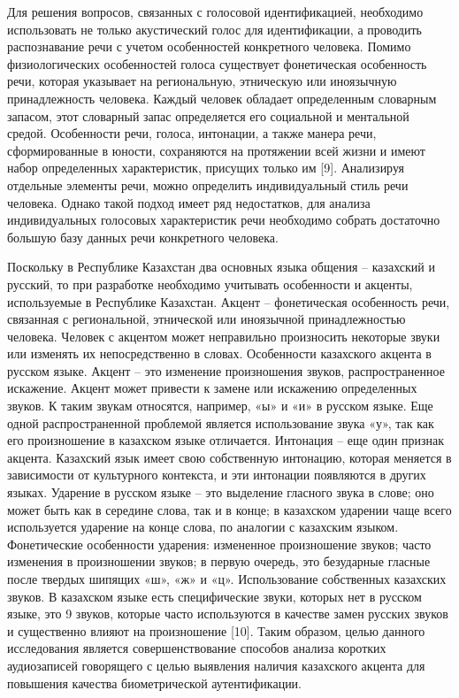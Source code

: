 Для решения вопросов, связанных с голосовой идентификацией, необходимо
использовать не только акустический голос для идентификации, а проводить
распознавание речи с учетом особенностей конкретного человека. Помимо
физиологических особенностей голоса существует фонетическая особенность
речи, которая указывает на региональную, этническую или иноязычную
принадлежность человека. Каждый человек обладает определенным словарным
запасом, этот словарный запас определяется его социальной и ментальной
средой. Особенности речи, голоса, интонации, а также манера речи,
сформированные в юности, сохраняются на протяжении всей жизни и имеют
набор определенных характеристик, присущих только им {[}9{]}. Анализируя
отдельные элементы речи, можно определить индивидуальный стиль речи
человека. Однако такой подход имеет ряд недостатков, для анализа
индивидуальных голосовых характеристик речи необходимо собрать
достаточно большую базу данных речи конкретного человека.

Поскольку в Республике Казахстан два основных языка общения -- казахский
и русский, то при разработке необходимо учитывать особенности и акценты,
используемые в Республике Казахстан. Акцент -- фонетическая особенность
речи, связанная с региональной, этнической или иноязычной
принадлежностью человека. Человек с акцентом может неправильно
произносить некоторые звуки или изменять их непосредственно в словах.
Особенности казахского акцента в русском языке. Акцент -- это изменение
произношения звуков, распространенное искажение. Акцент может привести к
замене или искажению определенных звуков. К таким звукам относятся,
например, «ы» и «и» в русском языке. Еще одной распространенной
проблемой является использование звука «у», так как его произношение в
казахском языке отличается. Интонация -- еще один признак акцента.
Казахский язык имеет свою собственную интонацию, которая меняется в
зависимости от культурного контекста, и эти интонации появляются в
других языках. Ударение в русском языке -- это выделение гласного звука
в слове; оно может быть как в середине слова, так и в конце; в казахском
ударении чаще всего используется ударение на конце слова, по аналогии с
казахским языком. Фонетические особенности ударения: измененное
произношение звуков; часто изменения в произношении звуков; в первую
очередь, это безударные гласные после твердых шипящих «ш», «ж» и «ц».
Использование собственных казахских звуков. В казахском языке есть
специфические звуки, которых нет в русском языке, это 9 звуков, которые
часто используются в качестве замен русских звуков и существенно влияют
на произношение {[}10{]}. Таким образом, целью данного исследования
является совершенствование способов анализа коротких аудиозаписей
говорящего с целью выявления наличия казахского акцента для повышения
качества биометрической аутентификации.

